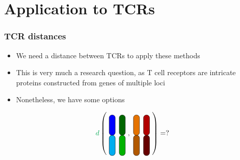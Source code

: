 \documentclass[mathserif,compress,xcolor={dvipsnames}]{beamer}
\newcommand*\ba{\[ \begin{aligned}}
\newcommand*\ea{\end{aligned} \]}
\renewcommand\;{\,}
\begin{document}
\section{Application to TCRs}

\begin{frame}\frametitle{TCR distances}
\begin{minipage}{0.49\linewidth}
\begin{itemize}
\item
We need a distance between TCRs to apply these methods
\bigskip
\item
This is very much a research question, as T cell receptors are intricate proteins constructed from genes of multiple loci
\bigskip
\item
Nonetheless, we have some options
\end{itemize}
\end{minipage}
\begin{minipage}{0.49\linewidth}
\ba
{\color{Green} d} \left(
\
\begin{tikzpicture}[baseline={(1, 1)}]
	\draw[rounded corners, fill=cyan] (0, 0) rectangle (0.3, 1) {};
	\draw[rounded corners, fill=blue] (0, 1) rectangle (0.3, 2) {};
	
		\draw[rounded corners, fill=black!30!green] (0.5, 0) rectangle (0.8, 1) {};
	\draw[rounded corners, fill=black!60!green] (0.5, 1) rectangle (0.8, 2) {};
\end{tikzpicture}
\ , \
\begin{tikzpicture}[baseline={(1, 1)}]
	\draw[rounded corners, fill=black!30!orange] (0, 0) rectangle (0.3, 1) {};
	\draw[rounded corners, fill=black!10!orange] (0, 1) rectangle (0.3, 2) {};
	
		\draw[rounded corners, fill=black!60!red] (0.5, 0) rectangle (0.8, 1) {};
	\draw[rounded corners, fill=black!30!red] (0.5, 1) rectangle (0.8, 2) {};
\end{tikzpicture}
\
\right)
= ?
\ea

\end{minipage}
\end{frame}
\end{document}

